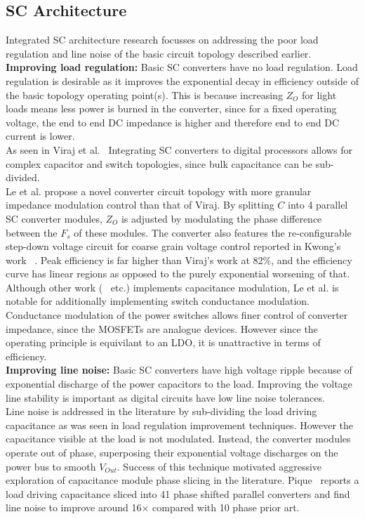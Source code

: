 \documentclass[letterpaper,twocolumn,10pt]{article}
\begin{document}
\subsection{SC Architecture}
Integrated SC architecture research focusses on addressing the poor load regulation and line noise of the basic circuit topology described earlier.\\
\textbf{Improving load regulation: }Basic SC converters have no load regulation. Load regulation is desirable as it improves the exponential decay in efficiency outside of the basic topology operating point(s). This is because increasing $Z_O$ for light loads means less power is burned in the converter, since for a fixed operating voltage, the end to end DC impedance is higher and therefore end to end DC current is lower.\\
\indent As seen in  Viraj et al.~\cite{Viraj2007} Integrating SC converters to digital processors allows for complex capacitor and switch topologies, since bulk capacitance can be sub-divided.\\
Le et al. \cite{Phuck2010} propose a novel converter circuit topology with more granular impedance modulation control than that of Viraj. By splitting $C$ into 4 parallel SC converter modules, $Z_O$ is adjusted by modulating the phase difference between the $F_s$ of these modules. The converter also features the re-configurable step-down voltage circuit for coarse grain voltage control reported in Kwong's work ~\cite{Kwong2009}. Peak efficiency is far higher than Viraj's work\cite{Viraj2007} at 82\%, and the efficiency curve has linear regions as opposed to the purely exponential worsening of that.\\
Although other work (~\cite{Ramadass2010} etc.) implements capacitance modulation, Le et al. is notable for additionally implementing switch conductance modulation.\\
Conductance modulation of the power switches allows finer control of converter impedance, since the MOSFETs are analogue devices. However since the operating principle is equivilant to an LDO, it is unattractive in terms of efficiency.\\ 
\textbf{Improving line noise: }Basic SC converters have high voltage ripple because of exponential discharge of the power capacitors to the load. Improving the voltage line stability is important as digital circuits have low line noise tolerances.\\ 
Line noise is addressed in the literature by sub-dividing the load driving capacitance as was seen in load regulation improvement techniques. However the capacitance visible at the load is not modulated. Instead, the converter modules operate out of phase, superposing their exponential voltage discharges on the power bus to smooth $V_{Out}$. Success of this technique motivated aggressive exploration of capacitance module phase slicing in the literature. Pique~\cite{Pique2012} reports a load driving capacitance sliced into 41 phase shifted parallel converters and find line noise to improve around 16$\times$ compared with 10 phase prior art.\\ 
\end{document}
